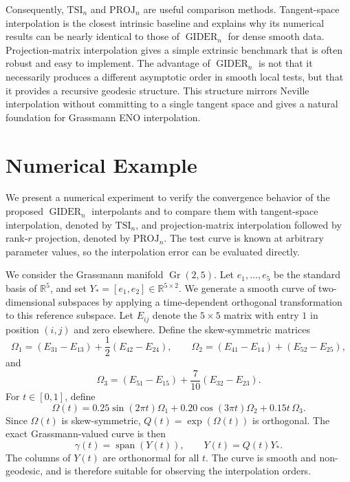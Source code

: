 \documentclass[a4paper,11pt]{article}
\newcommand{\bR}{\mathbb{R}}
\DeclareMathOperator{\Gr}{Gr}
\DeclareMathOperator{\spanop}{span}
\newcommand{\GIDER}{\operatorname{GIDER}}
\numberwithin{equation}{section}
\theoremstyle{plain}
\theoremstyle{definition}
\theoremstyle{remark}
\begin{document}
Consequently, \(\mathrm{TSI}_n\) and \(\mathrm{PROJ}_n\) are useful comparison methods.  Tangent-space interpolation is the closest intrinsic baseline and explains why its numerical results can be nearly identical to those of \(\GIDER_n\) for dense smooth data.  Projection-matrix interpolation gives a simple extrinsic benchmark that is often robust and easy to implement.  The advantage of \(\GIDER_n\) is not that it necessarily produces a different asymptotic order in smooth local tests, but that it provides a recursive geodesic structure.  This structure mirrors Neville interpolation without committing to a single tangent space and gives a natural foundation for Grassmann ENO interpolation.


\section{Numerical Example}\label{sec:numerical_example}

We present a numerical experiment to verify the convergence behavior of the proposed \(\GIDER_n\) interpolants and to compare them with tangent-space interpolation, denoted by \(\mathrm{TSI}_n\), and projection-matrix interpolation followed by rank-\(r\) projection, denoted by \(\mathrm{PROJ}_n\).  The test curve is known at arbitrary parameter values, so the interpolation error can be evaluated directly.

We consider the Grassmann manifold \(\Gr(2,5)\).  Let \(e_1,\ldots,e_5\) be the standard basis of \(\bR^5\), and set \(Y_\ast=[e_1,e_2]\in\bR^{5\times 2}\).  We generate a smooth curve of two-dimensional subspaces by applying a time-dependent orthogonal transformation to this reference subspace.  Let \(E_{ij}\) denote the \(5\times 5\) matrix with entry \(1\) in position \((i,j)\) and zero elsewhere.  Define the skew-symmetric matrices
\[
    \Omega_1=(E_{31}-E_{13})+\frac{1}{2}(E_{42}-E_{24}),\qquad
    \Omega_2=(E_{41}-E_{14})+(E_{52}-E_{25}),
\]
and
\[
    \Omega_3=(E_{51}-E_{15})+\frac{7}{10}(E_{32}-E_{23}).
\]
For \(t\in[0,1]\), define
\[
    \Omega(t)
    =
    0.25\sin(2\pi t)\Omega_1
    +
    0.20\cos(3\pi t)\Omega_2
    +
    0.15t\,\Omega_3.
\]
Since \(\Omega(t)\) is skew-symmetric, \(Q(t)=\exp(\Omega(t))\) is orthogonal.  The exact Grassmann-valued curve is then
\[
    \gamma(t)=\spanop(Y(t)),\qquad
    Y(t)=Q(t)Y_\ast.
\]
The columns of \(Y(t)\) are orthonormal for all \(t\).  The curve is smooth and non-geodesic, and is therefore suitable for observing the interpolation orders.
\end{document}
